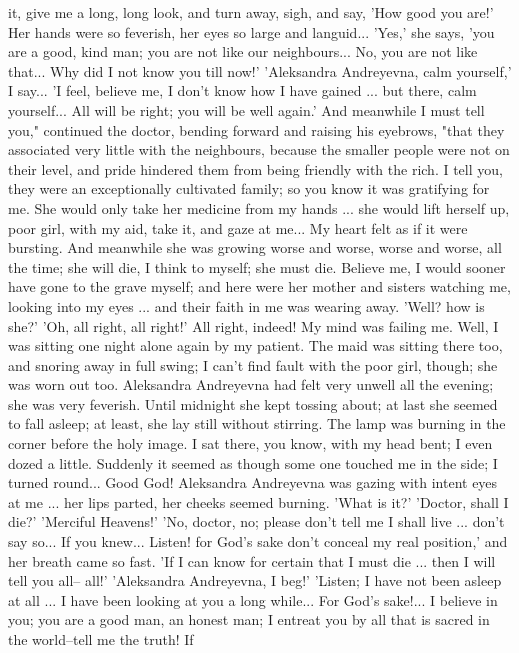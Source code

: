 it, give me a long, long look, and turn away, sigh, and say, 'How good
you are!' Her hands were so feverish, her eyes so large and languid...
'Yes,' she says, 'you are a good, kind man; you are not like our
neighbours... No, you are not like that... Why did I not know you till
now!' 'Aleksandra Andreyevna, calm yourself,' I say... 'I feel,
believe me, I don't know how I have gained ... but there, calm
yourself... All will be right; you will be well again.' And meanwhile
I must tell you," continued the doctor, bending forward and raising
his eyebrows, "that they associated very little with the neighbours,
because the smaller people were not on their level, and pride hindered
them from being friendly with the rich. I tell you, they were an
exceptionally cultivated family; so you know it was gratifying for me.
She would only take her medicine from my hands ... she would lift
herself up, poor girl, with my aid, take it, and gaze at me... My
heart felt as if it were bursting. And meanwhile she was growing worse
and worse, worse and worse, all the time; she will die, I think to
myself; she must die. Believe me, I would sooner have gone to the
grave myself; and here were her mother and sisters watching me,
looking into my eyes ... and their faith in me was wearing away.
'Well? how is she?' 'Oh, all right, all right!' All right, indeed! My
mind was failing me. Well, I was sitting one night alone again by my
patient. The maid was sitting there too, and snoring away in full
swing; I can't find fault with the poor girl, though; she was worn out
too. Aleksandra Andreyevna had felt very unwell all the evening; she
was very feverish. Until midnight she kept tossing about; at last she
seemed to fall asleep; at least, she lay still without stirring. The
lamp was burning in the corner before the holy image. I sat there, you
know, with my head bent; I even dozed a little. Suddenly it seemed as
though some one touched me in the side; I turned round... Good God!
Aleksandra Andreyevna was gazing with intent eyes at me ... her lips
parted, her cheeks seemed burning. 'What is it?' 'Doctor, shall I
die?' 'Merciful Heavens!' 'No, doctor, no; please don't tell me I
shall live ... don't say so... If you knew... Listen! for God's sake
don't conceal my real position,' and her breath came so fast. 'If I
can know for certain that I must die ... then I will tell you all--
all!' 'Aleksandra Andreyevna, I beg!' 'Listen; I have not been asleep
at all ... I have been looking at you a long while... For God's
sake!... I believe in you; you are a good man, an honest man; I
entreat you by all that is sacred in the world--tell me the truth! If
